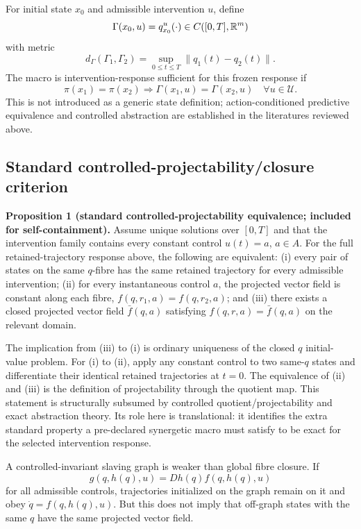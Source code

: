 For initial state $x_0$ and admissible intervention $u$, define
\begin{equation}
\Gamma(x_0,u)=q^u_{x_0}(\cdot)\in C([0,T],\mathbb{R}^m)
\end{equation}
with metric
\begin{equation}
d_\Gamma(\Gamma_1,\Gamma_2)=\sup_{0\le t\le T}\lVert q_1(t)-q_2(t)\rVert.
\end{equation}
The macro is intervention-response sufficient for this frozen response if
\begin{equation}
\pi(x_1)=\pi(x_2)\Longrightarrow \Gamma(x_1,u)=\Gamma(x_2,u)\quad\forall u\in\mathcal U.
\end{equation}
This is not introduced as a generic state definition; action-conditioned predictive equivalence and controlled abstraction are established in the literatures reviewed above.

\subsection{Standard controlled-projectability/closure criterion}

\textbf{Proposition 1 (standard controlled-projectability equivalence; included for self-containment).} Assume unique solutions over $[0,T]$ and that the intervention family contains every constant control $u(t)=a$, $a\in A$. For the full retained-trajectory response above, the following are equivalent: (i) every pair of states on the same $q$-fibre has the same retained trajectory for every admissible intervention; (ii) for every instantaneous control $a$, the projected vector field is constant along each fibre, $f(q,r_1,a)=f(q,r_2,a)$; and (iii) there exists a closed projected vector field $\bar f(q,a)$ satisfying $f(q,r,a)=\bar f(q,a)$ on the relevant domain.

The implication from (iii) to (i) is ordinary uniqueness of the closed $q$ initial-value problem. For (i) to (ii), apply any constant control to two same-$q$ states and differentiate their identical retained trajectories at $t=0$. The equivalence of (ii) and (iii) is the definition of projectability through the quotient map. This statement is structurally subsumed by controlled quotient/projectability and exact abstraction theory.\cite{TabuadaPappas2005,GirardPappas2007} Its role here is translational: it identifies the extra standard property a pre-declared synergetic macro must satisfy to be exact for the selected intervention response.

A controlled-invariant slaving graph is weaker than global fibre closure. If
\begin{equation}
g(q,h(q),u)=Dh(q)f(q,h(q),u)
\end{equation}
for all admissible controls, trajectories initialized on the graph remain on it and obey $\dot q=f(q,h(q),u)$. But this does not imply that off-graph states with the same $q$ have the same projected vector field.

